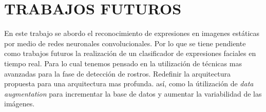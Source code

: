 \chapter*{TRABAJOS FUTUROS}

En este trabajo se abordo el reconocimiento de expresiones en imagenes estáticas por medio de redes neuronales convolucionales. Por lo que se tiene pendiente como trabajos futuros la realización de un clasificador de expresiones faciales en tiempo real. Para lo cual tenemos pensado en la utilización de técnicas mas avanzadas para la fase de detección de rostros. Redefinir la arquitectura propuesta para una arquitectura mas profunda. así, como la útilización de \textit{data augmentation} para incrementar la base de datos y aumentar la variabilidad de las imágenes.

